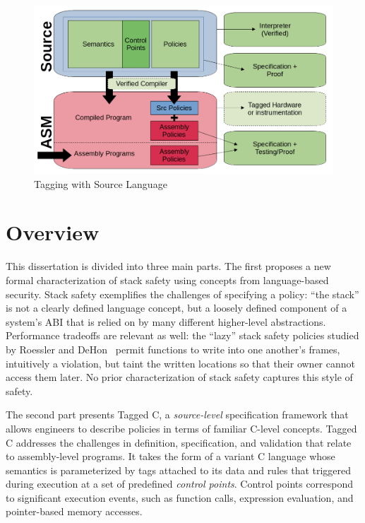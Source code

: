 \documentclass{report}
\begin{document}
\begin{figure}
  \includegraphics[width=\textwidth]{Structure.png}
  \caption{Tagging with Source Language}
  \label{fig:language}
\end{figure}

\section{Overview}

This dissertation is divided into three main parts. The first proposes a new formal characterization
of stack safety using concepts from language-based security. Stack safety exemplifies the challenges
of specifying a policy: ``the stack'' is not a clearly defined language concept, but a loosely
defined component of a system's ABI that is relied on by many different higher-level abstractions.
Performance tradeoffs are relevant as well: the ``lazy'' stack safety policies studied by
Roessler and DeHon~\cite{RoesslerD18} permit functions to write into one another's
frames, intuitively a violation, but taint the written locations so that their owner cannot
access them later. No prior characterization of stack safety captures this style of safety.

The second part presents Tagged C, a \emph{source-level} specification framework that allows
engineers to describe policies in terms of familiar C-level concepts. Tagged C addresses the
challenges in definition, specification, and validation that relate to assembly-level programs.
It takes the form of a variant C language whose semantics is parameterized by tags
attached to its data and rules that triggered during execution at a set of predefined
\emph{control points}. Control points correspond to significant execution events, such as
function calls, expression evaluation, and pointer-based memory accesses.
\end{document}
